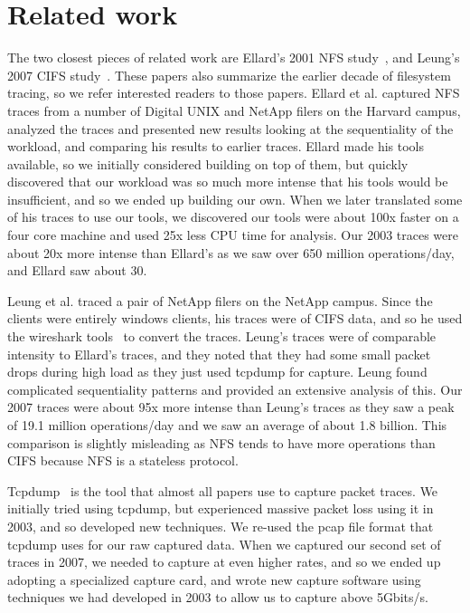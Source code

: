 \section{Related work}
\label{sec:related}

The two closest pieces of related work are Ellard's 2001 NFS
study~\cite{EllardFast03}, and Leung's 2007 CIFS
study~\cite{LeungUsenix08}.  These papers also summarize the earlier
decade of filesystem tracing, so we refer interested readers to those
papers.  Ellard et al. captured NFS traces from a number of Digital
UNIX and NetApp filers on the Harvard campus, analyzed the traces and
presented new results looking at the sequentiality of the workload,
and comparing his results to earlier traces.  Ellard made his tools
available, so we initially considered building on top of them, but
quickly discovered that our workload was so much more intense that his
tools would be insufficient, and so we ended up building our own.
When we later translated some of his traces to use our tools, we
discovered our tools were about 100x faster on a four core machine and
used 25x less CPU time for analysis.  Our 2003 traces were about 20x
more intense than Ellard's as we saw over 650 million operations/day,
and Ellard saw about 30.

Leung et al. traced a pair of NetApp filers on the NetApp campus.
Since the clients were entirely windows clients, his traces were of
CIFS data, and so he used the wireshark tools~\cite{wireshark} to
convert the traces.  Leung's traces were of comparable intensity to
Ellard's traces, and they noted that they had some small packet drops
during high load as they just used tcpdump for capture.  Leung found
complicated sequentiality patterns and provided an extensive analysis
of this.  Our 2007 traces were about 95x more intense than Leung's
traces as they saw a peak of 19.1 million operations/day and we saw an
average of about 1.8 billion.  This comparison is slightly misleading
as NFS tends to have more operations than CIFS because NFS is a
stateless protocol.

Tcpdump~\cite{tcpdump} is the tool that almost all papers use to capture packet
traces.  We initially tried using tcpdump, but experienced massive
packet loss using it in 2003, and so developed new techniques.  We
re-used the pcap file format that tcpdump uses for our raw captured
data.  When we captured our second set of traces in 2007, we needed to
capture at even higher rates, and so we ended up adopting a
specialized capture card, and wrote new capture software using
techniques we had developed in 2003 to allow us to capture above
5Gbits/s.

